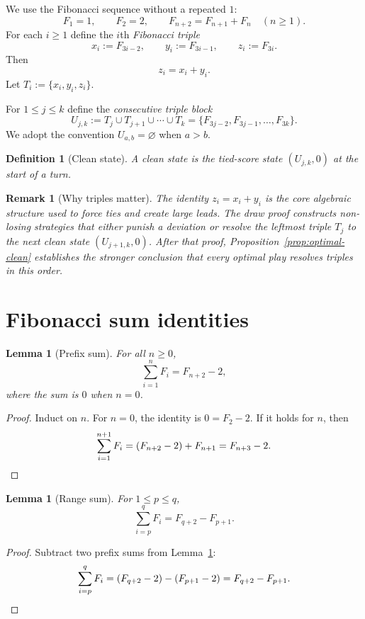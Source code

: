 \documentclass[11pt]{article}
\newtheorem{lemma}[theorem]{Lemma}
\newtheorem{definition}[theorem]{Definition}
\newtheorem{remark}[theorem]{Remark}
\begin{document}
We use the Fibonacci sequence without a repeated $1$:
\[
F_1=1,\qquad F_2=2,\qquad F_{n+2}=F_{n+1}+F_n \quad (n\ge 1).
\]
For each $i\ge 1$ define the $i$th \emph{Fibonacci triple}
\[
x_i:=F_{3i-2},\qquad y_i:=F_{3i-1},\qquad z_i:=F_{3i}.
\]
Then
\begin{equation}\label{eq:triple}
z_i=x_i+y_i.
\end{equation}
Let $T_i:=\{x_i,y_i,z_i\}$.

For $1\le j\le k$ define the \emph{consecutive triple block}
\[
U_{j,k}:=T_j\cup T_{j+1}\cup\cdots\cup T_k=\{F_{3j-2},F_{3j-1},\dots,F_{3k}\}.
\]
We adopt the convention $U_{a,b}=\varnothing$ when $a>b$.

\begin{definition}[Clean state]\label{def:clean}
A \emph{clean state} is the tied-score state $(U_{j,k},0)$ at the start of a turn.
\end{definition}

\begin{remark}[Why triples matter]
The identity $z_i=x_i+y_i$ is the core algebraic structure used to force ties and create large leads.
The draw proof constructs non-losing strategies that either punish a deviation or resolve the leftmost
triple $T_j$ to the next clean state $(U_{j+1,k},0)$. After that proof,
Proposition~\ref{prop:optimal-clean} establishes the stronger conclusion that every optimal play
resolves triples in this order.
\end{remark}

\section{Fibonacci sum identities}

\begin{lemma}[Prefix sum]\label{lem:prefixsum}
For all $n\ge 0$,
\[
\sum_{i=1}^n F_i = F_{n+2}-2,
\]
where the sum is $0$ when $n=0$.
\end{lemma}

\begin{proof}
Induct on $n$. For $n=0$, the identity is $0=F_2-2$. If it holds for $n$, then
\[
\sum_{i=1}^{n+1}F_i=(F_{n+2}-2)+F_{n+1}=F_{n+3}-2.\qedhere
\]
\end{proof}

\begin{lemma}[Range sum]\label{lem:rangesum}
For $1\le p\le q$,
\[
\sum_{i=p}^{q}F_i = F_{q+2}-F_{p+1}.
\]
\end{lemma}

\begin{proof}
Subtract two prefix sums from Lemma~\ref{lem:prefixsum}:
\[
\sum_{i=p}^{q}F_i=(F_{q+2}-2)-(F_{p+1}-2)=F_{q+2}-F_{p+1}.\qedhere
\]
\end{proof}
\end{document}
